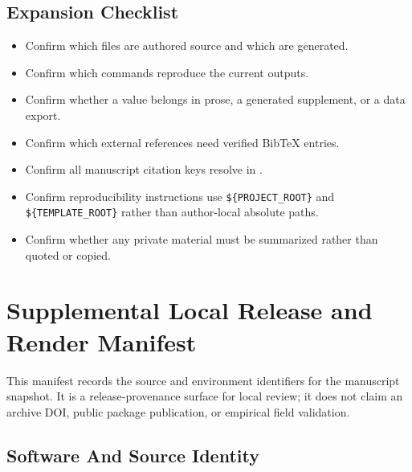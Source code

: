 \documentclass[
]{article}
\providecommand{\tightlist}{%
  \setlength{\itemsep}{0pt}\setlength{\parskip}{0pt}}
\begin{document}
\subsection{Expansion Checklist}\label{expansion-checklist}

\begin{itemize}
\tightlist
\item
  Confirm which files are authored source and which are generated.
\item
  Confirm which commands reproduce the current outputs.
\item
  Confirm whether a value belongs in prose, a generated supplement, or a
  data export.
\item
  Confirm which external references need verified BibTeX entries.
\item
  Confirm all manuscript citation keys resolve in
  .
\item
  Confirm reproducibility instructions use \texttt{\$\{PROJECT\_ROOT\}}
  and \texttt{\$\{TEMPLATE\_ROOT\}} rather than author-local absolute
  paths.
\item
  Confirm whether any private material must be summarized rather than
  quoted or copied.
\end{itemize}

\newpage

\section{Supplemental Local Release and Render
Manifest}\label{sec:release_manifest}

This manifest records the source and environment identifiers for the
manuscript snapshot. It is a release-provenance surface for local
review; it does not claim an archive DOI, public package publication, or
empirical field validation.

\subsection{Software And Source
Identity}\label{software-and-source-identity}
\end{document}
